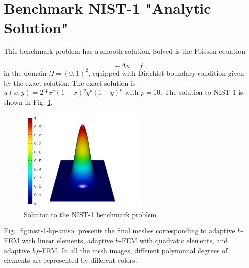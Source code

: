 \documentclass[12pt]{elsarticle}
\begin{document}

\section{Benchmark NIST-1 "Analytic Solution"}
\label{sec:bench-1}

This benchmark problem has a smooth solution.
Solved is the Poisson equation

\begin{equation} \label{poisson}
-\Delta u = f
\end{equation}
in the domain $\Omega = (0, 1)^2$, equipped with Dirichlet
boundary condition given by the exact solution.
The exact solution is $u(x, y) = 2^{4p}x^{p}(1-x)^{p}y^{p}(1-y)^{p}$
with $p = 10$.
The solution to NIST-1 is shown in Fig. \ref{fig:sln-nist01}.

\begin{figure}[H]
\centering
\includegraphics[height=5cm]{mafig1.pdf}
\caption{Solution to the NIST-1 benchmark problem.}
\label{fig:sln-nist01}
\end{figure}

Fig. \ref{fig:nist-1-hp-aniso} presents the final meshes corresponding to adaptive $h$-FEM with
linear elements, adaptive $h$-FEM with quadratic elements, and adaptive $hp$-FEM. In all the mesh images, different polynomial degrees of elements are represented by different colors.
\end{document}
